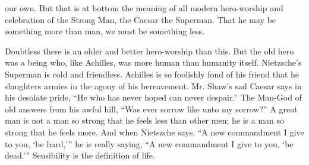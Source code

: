 our own. But that is at bottom the meaning of all modern hero-worship and celebration of the Strong Man, the Caesar the Superman. That he may be something more than man, we must be something less.

Doubtless there is an older and better hero-worship than this. But the old hero was a being who, like Achilles, was more human than humanity itself. Nietzsche’s Superman is cold and friendless. Achilles is so foolishly fond of his friend that he slaughters armies in the agony of his bereavement. Mr. Shaw’s sad Caesar says in his desolate pride, “He who has never hoped can never despair.” The Man-God of old answers from his awful hill, “Was ever sorrow like unto my sorrow?” A great man is not a man so strong that he feels less than other men; he is a man so strong that he feels more. And when Nietszche says, “A new commandment I give to you, `be hard,’” he is really saying, “A new commandment I give to you, `be dead.’” Sensibility is the definition of life.

